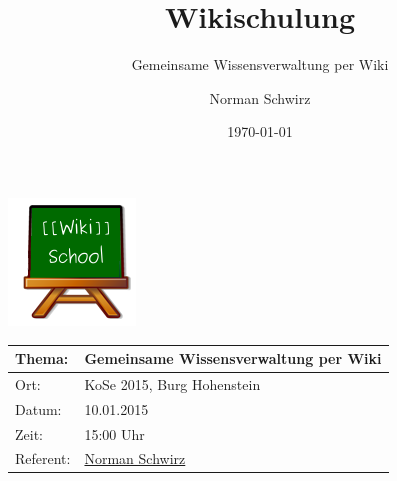 \documentclass{beamer}
\begin{document}
\title{Wikischulung}
\subtitle{Gemeinsame Wissensverwaltung per Wiki}
\author{Norman Schwirz}
\subject{Gemeinsame Wissensverwaltung per Wiki}
\date{\today}

\begin{frame}
  \begin{center}
    \includegraphics[keepaspectratio=true, scale=1]{wikischool-logo}
    \begin{tabular}{|l|l|}
      \toprule
      \textbf{Thema:} & \textbf{Gemeinsame Wissensverwaltung per Wiki} \\
      \midrule
       Ort:           & KoSe 2015, Burg Hohenstein \\ 
       Datum:         & 10.01.2015 \\
       Zeit:          & 15:00 Uhr \\ 
       Referent:      &  \href{http://www.stura.htw-dresden.de/members/NormanSchwirz}{Norman Schwirz}  \\ 
      \bottomrule
    \end{tabular}
  \end{center}
\end{frame}
\end{document}
